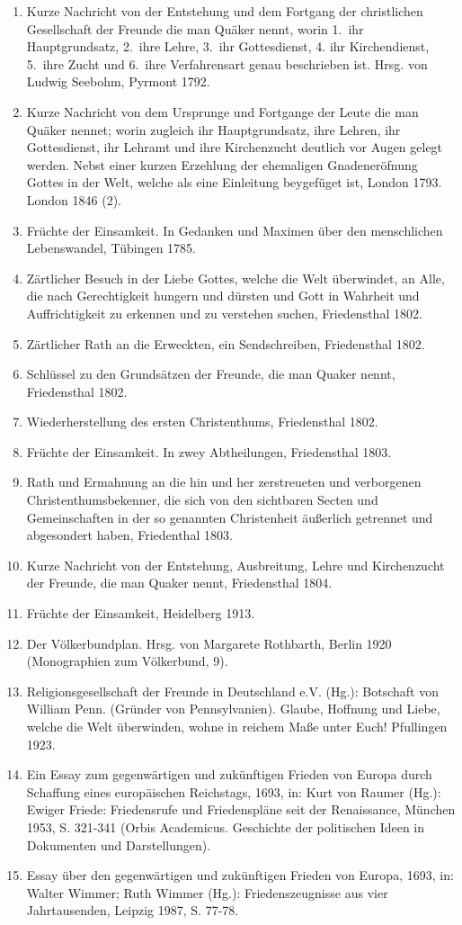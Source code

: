 \begin{enumerate}
 \item Kurze Nachricht von der Entstehung und dem Fortgang der christlichen
Gesellschaft der Freunde
die man Quäker nennt,
worin 1.~ihr Hauptgrundsatz, 2.~ihre Lehre, 3.~ihr Gottesdienst, 4. ihr Kirchendienst, 5.~ihre Zucht und 6.~ihre Verfahrensart genau beschrieben ist. Hrsg. von Ludwig Seebohm, Pyrmont 1792.
 \item Kurze Nachricht von dem Ursprunge und Fortgange der Leute die man
Quäker nennet; worin zugleich ihr Hauptgrundsatz, ihre Lehren, ihr
Gottesdienst, ihr Lehramt und ihre Kirchenzucht deutlich vor Augen gelegt werden.
Nebst einer kurzen Erzehlung der ehemaligen Gnadeneröfnung Gottes
in der Welt, welche als eine Einleitung beygefüget ist, London 1793. London 1846 (2).
 \item Früchte der Einsamkeit. In Gedanken und Maximen über den menschlichen
Lebenswandel, Tübingen 1785.
 \item Zärtlicher Besuch in der Liebe Gottes, welche die Welt überwindet, an
Alle, die nach Gerechtigkeit hungern und dürsten und Gott in Wahrheit und
Auffrichtigkeit zu erkennen und zu verstehen suchen, Friedensthal 1802.
 \item Zärtlicher Rath an die Erweckten, ein Sendschreiben, Friedensthal 1802.
 \item Schlüssel zu den Grundsätzen der Freunde, die man Quaker nennt,
Friedensthal 1802.
 \item Wiederherstellung des ersten Christenthums, Friedensthal 1802.
 \item Früchte der Einsamkeit. In zwey Abtheilungen, Friedensthal 1803.
 \item Rath und Ermahnung an die hin und her zerstreueten und verborgenen
Christenthumsbekenner, die sich von den sichtbaren Secten und Gemeinschaften
in der so genannten Christenheit äußerlich
getrennet und abgesondert haben, Friedenthal 1803.
 \item Kurze Nachricht von der Entstehung, Ausbreitung, Lehre und Kirchenzucht
der Freunde, die man Quaker nennt, Friedensthal 1804.
 \item Früchte der Einsamkeit, Heidelberg 1913.
 \item Der Völkerbundplan. Hrsg. von Margarete Rothbarth, Berlin 1920
(Monographien zum Völkerbund, 9).
 \item Religionsgesellschaft der Freunde in Deutschland e.V. (Hg.): Botschaft
von William Penn. (Gründer von Pennsylvanien). Glaube, Hoffnung und Liebe,
welche die Welt überwinden, wohne in reichem Maße unter Euch! Pfullingen 1923.
 \item Ein Essay zum gegenwärtigen und zukünftigen Frieden von Europa durch
Schaffung eines europäischen Reichstags,
1693, in: Kurt von Raumer (Hg.): Ewiger Friede: Friedensrufe und Friedenspläne seit der Renaissance, München 1953, S. 321-341 (Orbis Academicus. Geschichte der politischen Ideen in Dokumenten und Darstellungen).
 \item Essay über den gegenwärtigen und zukünftigen Frieden von Europa, 1693,
in: Walter Wimmer; Ruth Wimmer (Hg.): Friedenszeugnisse aus vier
Jahrtausenden, Leipzig 1987, S. 77-78.
\end{enumerate}